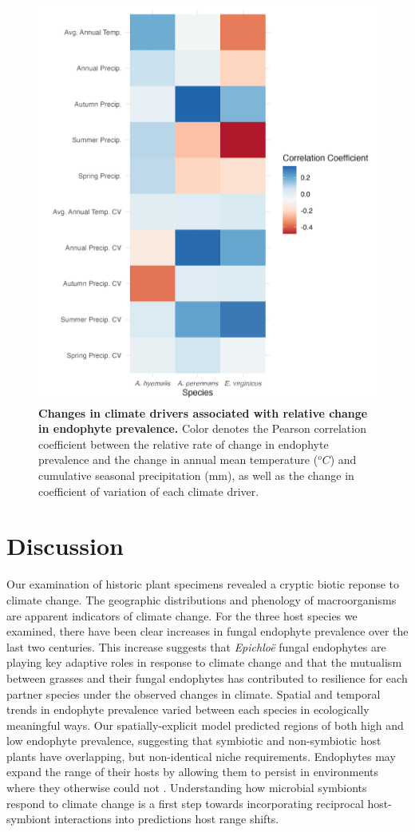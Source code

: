 \documentclass[11pt]{article}
\begin{document}
\begin{figure}[H]
	\centering
	\includegraphics[width = .8\linewidth]{climate_corr_heatmap.png}
	\caption{\textbf{Changes in climate drivers associated with relative change in endophyte prevalence.} Color denotes the Pearson correlation coefficient between the relative rate of change in endophyte prevalence and the change in annual mean temperature ($^oC$) and cumulative seasonal precipitation (mm), as well as the change in coefficient of variation of each climate driver.}
\end{figure}

\section*{Discussion}
Our examination of historic plant specimens revealed a cryptic biotic reponse to climate change. 
The geographic distributions and phenology of macroorganisms are apparent indicators of climate change.
For the three host species we examined, there have been clear increases in fungal endophyte prevalence over the last two centuries.
This increase suggests that \emph{Epichloë} fungal endophytes are playing key adaptive roles in response to climate change and that the mutualism between grasses and their fungal endophytes has contributed to resilience for each partner species under the observed changes in climate. 
Spatial and temporal trends in endophyte prevalence varied between each species in ecologically meaningful ways.
Our spatially-explicit model predicted regions of both high and low endophyte prevalence, suggesting that symbiotic and non-symbiotic host plants have overlapping, but non-identical niche requirements. 
Endophytes may expand the range of their hosts by allowing them to persist in environments where they otherwise could not \citep{afkhami2014mutualist, kazenel2015mutualistic}.
Understanding how microbial symbionts respond to climate change is a first step towards incorporating reciprocal host-symbiont interactions into predictions host range shifts.
\end{document}
